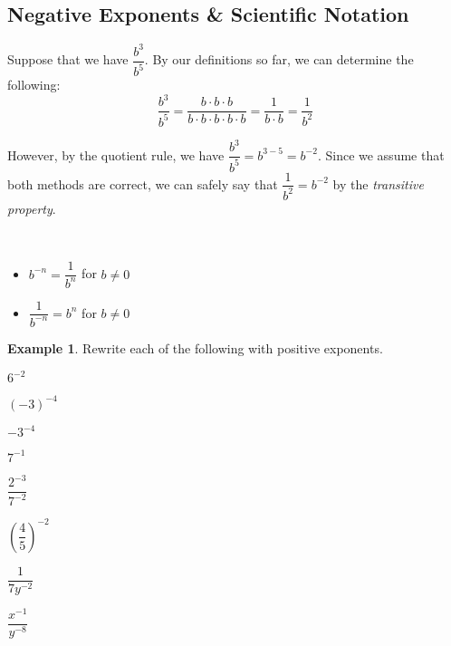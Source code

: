\documentclass[addpoints,12pt]{exam}
\theoremstyle{definition}
\theoremstyle{break}
\theoremstyle{break}
\newtheorem{example}{Example}[subsection]
\begin{document}
\setcounter{section}{5}
\setcounter{subsection}{6}

\subsection{Negative Exponents \& Scientific Notation}

\vspace{.15in}
Suppose that we have $\dfrac{b^3}{b^5}$. By our definitions so far, we can determine the following:
\[\dfrac{b^3}{b^5} = \dfrac{b\cdot b\cdot b}{b\cdot b\cdot b\cdot b\cdot b} = \dfrac{1}{b\cdot b} = \dfrac{1}{b^2}\]

However, by the quotient rule, we have $\dfrac{b^3}{b^5} = b^{3-5} = b^{-2}$. Since we assume that both methods are correct, we can safely say that $\dfrac{1}{b^2} = b^{-2}$ by the \emph{transitive property}.
\vspace{.15in}

\begin{definition}\mbox{}\\
\begin{itemize}
\item $b^{-n} = \dfrac{1}{b^n}$ for $b\neq 0$
\item $\dfrac{1}{b^{-n}} = b^n$ for $b \neq 0$
\end{itemize}
\end{definition}
\vspace{.15in}

\begin{example}
Rewrite each of the following with positive exponents.
\begin{enumerate}
\begin{minipage}{.5\textwidth}
\item $6^{-2}$
\vspace{.4in}
\item $(-3)^{-4}$
\vspace{.4in}
\item $-3^{-4}$
\vspace{.4in}
\item $7^{-1}$
\end{minipage}%
\begin{minipage}{.5\textwidth}
\item $\dfrac{2^{-3}}{7^{-2}}$
\vspace{.15in}
\item $\left(\dfrac{4}{5}\right)^{-2}$
\vspace{.15in}
\item $\dfrac{1}{7y^{-2}}$
\vspace{.15in}
\item $\dfrac{x^{-1}}{y^{-8}}$
\end{minipage}%
\end{enumerate}
\end{example}
\end{document}
